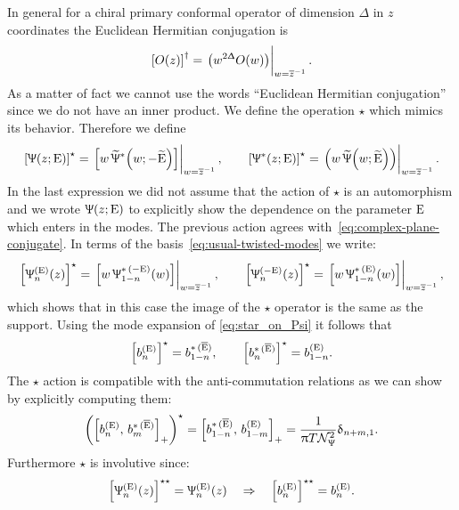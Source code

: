In general for a chiral primary conformal operator of dimension $\Delta$ in $z$ coordinates the Euclidean Hermitian conjugation is
\begin{equation}
  \qty[ O(z) ]^\dagger = \eval{ \qty( w^{2\Delta} O(w) ) }_{w = \barz^{-1}}.
\end{equation}
As a matter of fact we cannot use the words ``Euclidean Hermitian conjugation'' since we do not have an inner product.
We define the operation $\star$ which mimics its behavior.
Therefore we define
\begin{equation}
  \qty[ \Psi\qty( z; \rE ) ]^{\star}
  =
  \eval{\qty[ w\, \tPsi^*\qty( w; -\trE ) ]}_{w = \barz^{-1}},
  \qquad
  \qty[ \Psi^*\qty( z; \rE ) ]^{\star}
  = \eval{\qty( w\, \tPsi\qty( w; \trE ) )}_{w = \barz^{-1}}.
  \label{eq:star_on_Psi}
\end{equation}
In the last expression we did not assume that the action of $\star$ is an automorphism and we wrote $\Uppsi\qty( z; \mathrm{E} )$ to explicitly show the dependence on the parameter $\mathrm{E}$ which enters in the modes.
The previous action agrees with~\eqref{eq:complex-plane-conjugate}.
In terms of the basis~\eqref{eq:usual-twisted-modes} we write:\footnotemark{}
\begin{equation}
  \qty[ \Psi_n^{( \rE )}(z) ]^{\star}
  =
  \eval{\qty[ w\, \Psi_{1-n}^{*\, ( -\rE )}\qty( w ) ]}_{w = \barz^{-1}},
  \qquad
  \qty[ \Psi_n^{( -\rE )}(z) ]^{\star}
  =
  \eval{\qty[ w\, \Psi_{1-n}^{*\, ( \rE )}\qty( w ) ]}_{w = \barz^{-1}},
\end{equation}
which shows that in this case the image of the $\star$ operator is the same as the support.
Using the mode expansion of \eqref{eq:star_on_Psi} it follows that
\begin{equation}
  \qty[ b^{(\mathrm{E})}_n ]^{\star} = b^{*\, ( \overline{\mathrm{E}} )}_{1-n},
  \qquad
  \qty[ b^{*\, ( \overline{\mathrm{E}} )}_n ]^{\star} = b^{(\mathrm{E})}_{1-n}.
  \label{eq:star_usual_twisted}
\end{equation}
The $\star$ action is compatible with the anti-commutation relations as we can show by explicitly computing them:
\begin{equation}
  \qty(%
    \liebraket{b^{(\rE)}_n}{b^{*\, ( \brE )}_m}_+
  )^{\star}
  =
  \liebraket{b^{*\, ( \brE )}_{1-n}}{b^{(\rE)}_{1-m}}_+
  =
  \frac{1}{\pi T \cN_{\Psi}^2} \delta_{n+m, 1}.
\end{equation}
Furthermore $\star$ is involutive since:
\begin{equation}
  \qty[ \Uppsi_n^{( \mathrm{E} )}( z ) ]^{\star \star} 
  =
  \Uppsi_n^{( \mathrm{E} )}( z )
  \quad
  \Rightarrow
  \quad
  \qty[ b^{(\mathrm{E})}_n ]^{\star \star}
  =
  b^{(\mathrm{E})}_n.
\end{equation}



